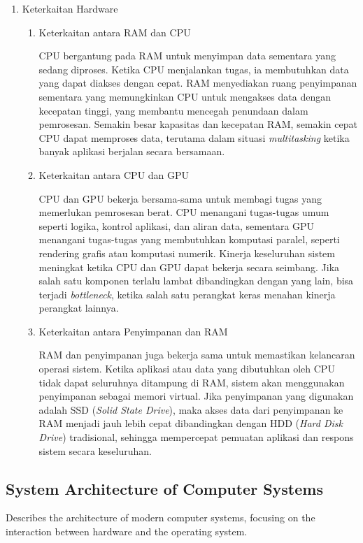 \documentclass[12pt]{article}
\begin{document}
\begin{enumerate}
    \item {Keterkaitan Hardware}
    \par \begin{enumerate}
        \item {Keterkaitan antara RAM dan CPU}
        \par CPU bergantung pada RAM untuk menyimpan data sementara yang sedang diproses. Ketika CPU menjalankan tugas, ia membutuhkan data yang dapat diakses dengan cepat. RAM menyediakan ruang penyimpanan sementara yang memungkinkan CPU untuk mengakses data dengan kecepatan tinggi, yang membantu mencegah penundaan dalam pemrosesan. Semakin besar kapasitas dan kecepatan RAM, semakin cepat CPU dapat memproses data, terutama dalam situasi \textit{multitasking} ketika banyak aplikasi berjalan secara bersamaan.
    
        \item {Keterkaitan antara CPU dan GPU}
        \par CPU dan GPU bekerja bersama-sama untuk membagi tugas yang memerlukan pemrosesan berat. CPU menangani tugas-tugas umum seperti logika, kontrol aplikasi, dan aliran data, sementara GPU menangani tugas-tugas yang membutuhkan komputasi paralel, seperti rendering grafis atau komputasi numerik. Kinerja keseluruhan sistem meningkat ketika CPU dan GPU dapat bekerja secara seimbang. Jika salah satu komponen terlalu lambat dibandingkan dengan yang lain, bisa terjadi \textit{bottleneck}, ketika salah satu perangkat keras menahan kinerja perangkat lainnya.
    
        \item {Keterkaitan antara Penyimpanan dan RAM}
        \par RAM dan penyimpanan juga bekerja sama untuk memastikan kelancaran operasi sistem. Ketika aplikasi atau data yang dibutuhkan oleh CPU tidak dapat seluruhnya ditampung di RAM, sistem akan menggunakan penyimpanan sebagai memori virtual. Jika penyimpanan yang digunakan adalah SSD (\textit{Solid State Drive}), maka akses data dari penyimpanan ke RAM menjadi jauh lebih cepat dibandingkan dengan HDD (\textit{Hard Disk Drive}) tradisional, sehingga mempercepat pemuatan aplikasi dan respons sistem secara keseluruhan.
    
    \end{enumerate} 

\end{enumerate}

\subsection{System Architecture of Computer Systems}
Describes the architecture of modern computer systems, focusing on the interaction between hardware and the operating system.
\end{document}
